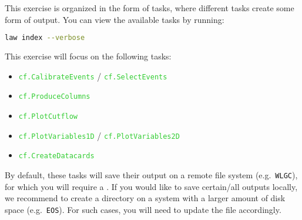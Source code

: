 This exercise is organized in the form of  tasks, where different tasks create some form of output. You can view the available tasks by running:
\begin{lstlisting}[language=bash]
law index --verbose
\end{lstlisting}

This exercise will focus on the following tasks:

\begin{itemize}
    \item \texttt{\textcolor{LimeGreen}{cf.CalibrateEvents}} / \texttt{\textcolor{LimeGreen}{cf.SelectEvents}}
    \item \texttt{\textcolor{LimeGreen}{cf.ProduceColumns}}
    \item \texttt{\textcolor{LimeGreen}{cf.PlotCutflow}}
    \item \texttt{\textcolor{LimeGreen}{cf.PlotVariables1D}} / \texttt{\textcolor{LimeGreen}{cf.PlotVariables2D}}
    \item \texttt{\textcolor{LimeGreen}{cf.CreateDatacards}}
\end{itemize}

By default, these tasks will save their output on a remote file system (e.g.\ \texttt{WLGC}), for which you will require a . If you would like to save certain/all outputs locally, we recommend to create a directory on a system with a larger amount of disk space (e.g.\ \texttt{EOS}). For such cases, you will need to update the  file accordingly.

